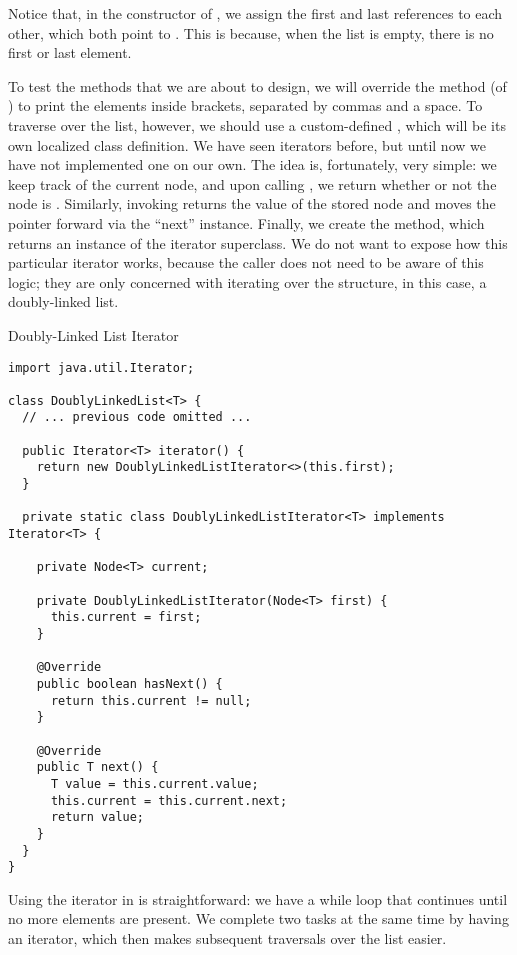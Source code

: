 Notice that, in the constructor of , we assign the first and last references to each other, which both point to . This is because, when the list is empty, there is no first or last element.

To test the methods that we are about to design, we will override the  method (of ) to print the elements inside brackets, separated by commas and a space. To traverse over the list, however, we should use a custom-defined , which will be its own localized class definition. We have seen iterators before, but until now we have not implemented one on our own. The idea is, fortunately, very simple: we keep track of the current node, and upon calling , we return whether or not the node is . Similarly, invoking  returns the value of the stored node and moves the pointer forward via the ``next'' instance. Finally, we create the  method, which returns an instance of the iterator superclass. We do not want to expose how this particular iterator works, because the caller does not need to be aware of this logic; they are only concerned with iterating over the structure, in this case, a doubly-linked list.

\begin{cl}[]{Doubly-Linked List Iterator}
\begin{lstlisting}[language=MyJava]
import java.util.Iterator;

class DoublyLinkedList<T> {
  // ... previous code omitted ...

  public Iterator<T> iterator() {
    return new DoublyLinkedListIterator<>(this.first);
  }

  private static class DoublyLinkedListIterator<T> implements Iterator<T> {
    
    private Node<T> current;

    private DoublyLinkedListIterator(Node<T> first) {
      this.current = first;
    }

    @Override
    public boolean hasNext() { 
      return this.current != null; 
    }

    @Override
    public T next() {
      T value = this.current.value;
      this.current = this.current.next;
      return value;
    }
  }
}
\end{lstlisting}
\end{cl}

Using the iterator in  is straightforward: we have a while loop that continues until no more elements are present. We complete two tasks at the same time by having an iterator, which then makes subsequent traversals over the list easier.


